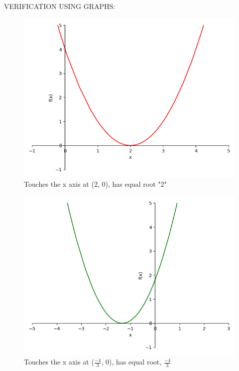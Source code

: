 \documentclass[journal,12pt,twocolumn]{IEEEtran}
\begin{document}
		 \newpage
		 
		 VERIFICATION USING GRAPHS:
		 
		 \begin{figure}[h!]
		  \centering
		  \includegraphics[width = \columnwidth]{Figure_1.png}
		      \caption{Touches the x axis at (2, 0), has equal root "2"}
		      \label{Figure_1}
		 \end{figure}
		 
		 
		\begin{figure}[h!]
		  \centering
		  \includegraphics[width = \columnwidth]{Figure_2.png}
		      \caption{Touches the x axis at ($\frac{-4}{3}$, 0), has equal root, $\frac{-4}{3}$}
		      \label{Figure_2}
		 \end{figure}
\end{document}
